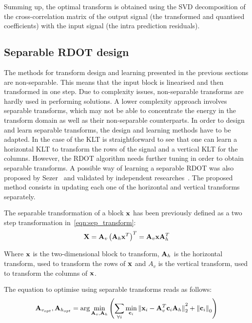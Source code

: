 \documentclass[11pt,a4paper,openright,twoside]{book}
\numberwithin{equation}{section} %
\numberwithin{figure}{section} %
\numberwithin{table}{section} %
\begin{document}
Summing up, the optimal transform is obtained using the SVD decomposition of
the cross-correlation matrix of the output signal (the transformed and
quantised coefficients) with the input signal (the intra prediction
residuals).

\subsection{Separable \ac{RDOT} design}
\label{sub:separable_rdot_design}

The methods for transform design and learning presented in the previous
sections are non-separable.
This means that the input block is linearised and then transformed in
one step.
Due to complexity issues, non-separable transforms are hardly used in
performing solutions.
A lower complexity approach involves separable transforms, which may not be
able to concentrate the energy in the transform domain as well as their
non-separable counterparts.
In order to design and learn separable transforms, the design and learning
methods have to be adapted.
In the case of the \ac{KLT} is straightforward to see that one can learn
a horizontal \ac{KLT} to transform the rows of the signal and a vertical
\ac{KLT} for the columns.
However, the \ac{RDOT} algorithm needs further tuning in order to obtain
separable transforms.
A possible way of learning a separable \ac{RDOT} was also proposed by
Sezer~\cite{sezer-11-phd} and validated by independent
researches~\cite{sole-09-sparsity-optimisation-separable-transforms}.
The proposed method consists in updating each one of the horizontal and
vertical transforms separately.

The separable transformation of a block $\mathbf{x}$ has been previously defined as a
two step transformation in~\eqref{eqn:sep_transform}:
\begin{equation*}
  \mathbf{X} = {\mathbf{A}_v\left( \mathbf{A}_h \mathbf{x}^T \right)}^T = \mathbf{A}_v \mathbf{x} \mathbf{A}_h^T
\end{equation*}

Where $\mathbf{x}$ is the two-dimensional block to transform, $\mathbf{A}_h$ is the horizontal
transform, used to transform the rows of $\mathbf{x}$ and $A_v$ is the vertical
transform, used to transform the columns of $\mathbf{x}$.

The equation to optimise using separable transforms reads as follows:
\begin{equation}
  \mathbf{A}_{v_{opt}}, \mathbf{A}_{h_{opt}} = \text{arg}\min\limits_{\mathbf{A}_v,\mathbf{A}_h}
  \left(
  \sum_{\forall i} \min\limits_{\mathbf{c}_i}{\Vert \mathbf{x}_i - \mathbf{A}_v^T\mathbf{c}_i\mathbf{A}_h \Vert}_2^2
  + {\Vert \mathbf{c}_i \Vert}_0
  \right)
\end{equation}
\end{document}
